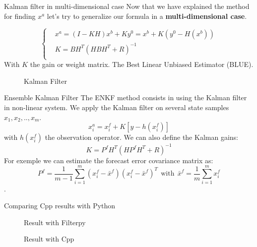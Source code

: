 \begin{frame}{Kalman filter in multi-dimensional case}
   Now that we have explained the method for finding $x^a$ let's try to generalize our formula in a \textbf{multi-dimensional case}.

   $$\left\{\begin{aligned}
     &x^a=(I-KH)x^b+Ky^0=x^b+K(y^0-H(x^b)) \\
           &K=BH^T(HBH^T+R)^{-1} \\
    \end{aligned}\right.$$
   With $K$ the gain or weight matrix.
   The Best Linear Unbiased Estimator (BLUE).
   \begin{figure}[H]
       \caption{Kalman Filter}
   \end{figure}
\end{frame}
\begin{frame}{Ensemble Kalman Filter}
   The ENKF method consists in using the Kalman filter in non-linear system.
   \newline We apply the Kalman filter on several state samples $x_1,x_2,..,x_{m}$.
   $$x_i^a=x_i^f+K[y-h(x_i^f)]$$
   with $h(x_i^f)$ the observation operator.
   We can also define the Kalman gains: 
   $$K=P^f H^T(HP^f H^T+R)^{-1}$$
   For exemple we can estimate the
   forecast error covariance matrix as:
   $$P^f=\frac{1}{m-1}\sum_{i=1}^{m}(x_i^f-\bar{x}^f)(x_i^f-\bar{x}^f)^T~~\text{with}~~\bar{x}^f=\frac{1}{m}\sum_{i=1}^{m}x_i^f $$ .
\end{frame}
\begin{frame}{Comparing Cpp results with Python}
\begin{figure}[H]
       \caption{Result with Filterpy}
   \end{figure}
   \begin{figure}[H]
       \caption{Result with Cpp}
   \end{figure}
\end{frame}
